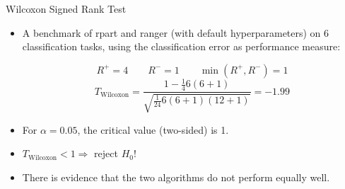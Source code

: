 \documentclass[11pt,compress,t,notes=noshow, aspectratio=169, xcolor=table]{beamer}
\begin{document}
\begin{frame}{Wilcoxon Signed Rank Test}
    \begin{itemize}
        \item A benchmark of rpart and ranger (with default hyperparameters) on 6 classification tasks, using the classification error as performance measure:
    {   
        \scriptsize
        
    }

$$
    R^{+} = 4\qquad R^{-} = 1\qquad \min(R^{+}, R^{-}) = 1
    $$
    $$
    T_{\text{Wilcoxon}} = \frac{1 - \frac{1}{4}6(6 + 1)}{\sqrt{\frac{1}{24}6(6 + 1)(12 + 1)}} = - 1.99 
    $$
    \item For $\alpha = 0.05$, the critical value (two-sided) is 1.
    \item $T_{\text{Wilcoxon}} < 1 \Rightarrow$ reject $H_0$! 
    \item There is evidence that the two algorithms do not perform equally well.
\end{itemize}


\end{frame}
\end{document}
